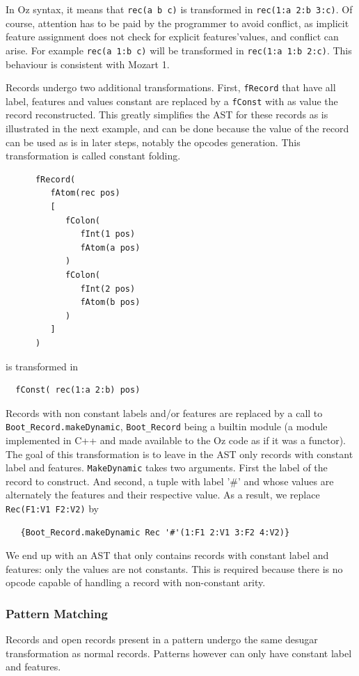 \documentclass[a4paper]{memoir}
\begin{document}
In Oz syntax, it means that \lstinline!rec(a b c)! is transformed in
\lstinline!rec(1:a 2:b 3:c)!. Of course, attention has to be paid by the
programmer to avoid conflict, as implicit feature assignment does not check for
explicit features'values, and conflict can arise. For example \lstinline!rec(a 1:b c)! will be transformed in \lstinline!rec(1:a 1:b 2:c)!. This behaviour is
consistent with Mozart 1.

Records undergo two additional transformations. First, \lstinline!fRecord! that
have all label, features and values constant are replaced by a
\lstinline!fConst! with as value the record reconstructed. This greatly
simplifies the AST for these records as is illustrated in the next example, and
can be done because the value of the record can be used as is in later steps,
notably the opcodes generation. This transformation is called constant folding.
\begin{lstlisting}
      fRecord(
         fAtom(rec pos)
         [
            fColon(
               fInt(1 pos)
               fAtom(a pos)
            )
            fColon(
               fInt(2 pos)
               fAtom(b pos)
            )
         ]
      )
\end{lstlisting}
is transformed in
\begin{lstlisting}
  fConst( rec(1:a 2:b) pos)
\end{lstlisting}


Records with non constant labels and/or features are replaced by a call to
\lstinline!Boot_Record.makeDynamic!, \lstinline!Boot_Record! being a builtin module (a module implemented in C++ and made available to the Oz code as if it was a functor). The goal of this transformation is to leave
in the AST only records with constant label and features.
\lstinline!MakeDynamic! takes two arguments. First the label of the record to construct. And second, a tuple with label '\#' and whose values are alternately the features and their respective value. As a result, we replace \lstinline!Rec(F1:V1 F2:V2)! by 
\begin{lstlisting}
   {Boot_Record.makeDynamic Rec '#'(1:F1 2:V1 3:F2 4:V2)}
\end{lstlisting}

We end up with an AST that only contains records with constant label and features: only the values are not constants.
This is required because there is no opcode capable of handling a record with non-constant arity.

\subsubsection{Pattern Matching}
Records and open records present in a pattern undergo the same desugar
transformation as normal records. Patterns however can only have constant label
and features.
\end{document}
